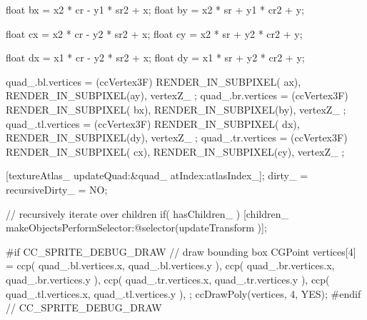 \begin{DoxyCode}
{{{                        float bx = x2 * cr - y1 * sr2 + x;
                        float by = x2 * sr + y1 * cr2 + y;

                        float cx = x2 * cr - y2 * sr2 + x;
                        float cy = x2 * sr + y2 * cr2 + y;

                        float dx = x1 * cr - y2 * sr2 + x;
                        float dy = x1 * sr + y2 * cr2 + y;

                        quad_.bl.vertices = (ccVertex3F) { RENDER_IN_SUBPIXEL(
      ax), RENDER_IN_SUBPIXEL(ay), vertexZ_ };
                        quad_.br.vertices = (ccVertex3F) { RENDER_IN_SUBPIXEL(
      bx), RENDER_IN_SUBPIXEL(by), vertexZ_ };
                        quad_.tl.vertices = (ccVertex3F) { RENDER_IN_SUBPIXEL(
      dx), RENDER_IN_SUBPIXEL(dy), vertexZ_ };
                        quad_.tr.vertices = (ccVertex3F) { RENDER_IN_SUBPIXEL(
      cx), RENDER_IN_SUBPIXEL(cy), vertexZ_ };
                }

                [textureAtlas_ updateQuad:&quad_ atIndex:atlasIndex_];
                dirty_ = recursiveDirty_ = NO;
        }

        // recursively iterate over children
        if( hasChildren_ )
                [children_ makeObjectsPerformSelector:@selector(updateTransform
      )];

#if CC_SPRITE_DEBUG_DRAW
        // draw bounding box
        CGPoint vertices[4] = {
                ccp( quad_.bl.vertices.x, quad_.bl.vertices.y ),
                ccp( quad_.br.vertices.x, quad_.br.vertices.y ),
                ccp( quad_.tr.vertices.x, quad_.tr.vertices.y ),
                ccp( quad_.tl.vertices.x, quad_.tl.vertices.y ),
        };
        ccDrawPoly(vertices, 4, YES);
#endif // CC_SPRITE_DEBUG_DRAW

}
\end{DoxyCode}


